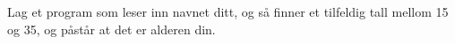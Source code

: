 %
%
Lag et program som leser inn navnet ditt, og så finner et tilfeldig tall
mellom 15 og 35, og påstår at det er alderen din.
